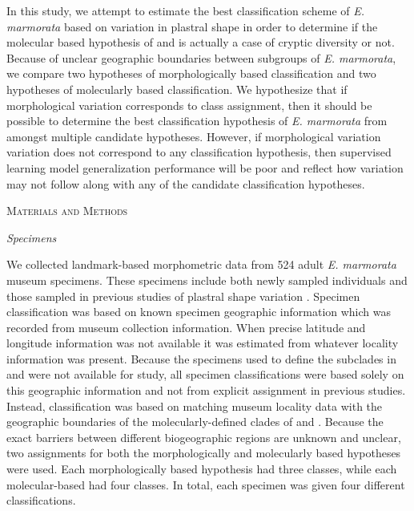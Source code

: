 \documentclass[12pt,letterpaper]{article}\usepackage{graphicx, color}
\renewcommand{\section}[1]{%
\bigskip
\begin{center}
\begin{Large}
\normalfont\scshape #1
\medskip
\end{Large}
\end{center}}
\renewcommand{\subsection}[1]{%
\bigskip
\begin{center}
\begin{large}
\normalfont\itshape #1
\end{large}
\end{center}}
\begin{document}
In this study, we attempt to estimate the best classification scheme of \textit{E. marmorata} based on variation in plastral shape in order to determine if the molecular based hypothesis of \citet{Spinks2005} and \citet{Spinks2010} is actually a case of cryptic diversity or not. Because of unclear geographic boundaries between subgroups of \textit{E. marmorata}, we compare two hypotheses of morphologically based classification and two hypotheses of molecularly based classification. We hypothesize that if morphological variation corresponds to class assignment, then it should be possible to determine the best classification hypothesis of \textit{E. marmorata} from amongst multiple candidate hypotheses. However, if morphological variation variation does not correspond to any classification hypothesis, then supervised learning model generalization performance will be poor and reflect how variation may not follow along with any of the candidate classification hypotheses.

\section{Materials and Methods}
\subsection{Specimens}
We collected landmark-based morphometric data from 524 adult \textit{E. marmorata} museum specimens. These specimens include both newly sampled individuals and those sampled in previous studies of plastral shape variation \citep{Angielczyk2007,Angielczyk2011,Angielczyk2013a}. 
Specimen classification was based on known specimen geographic information which was recorded from museum collection information. When precise latitude and longitude information was not available it was estimated from whatever locality information was present. Because the specimens used to define the subclades in \citet{Spinks2005} and \citet{Spinks2010} were not available for study, all specimen classifications were based solely on this geographic information and not from explicit assignment in previous studies. Instead, classification was based on matching museum locality data with the geographic boundaries of the molecularly-defined clades of \citet{Spinks2005} and \citet{Spinks2010}. Because the exact barriers between different biogeographic regions are unknown and unclear, two assignments for both the morphologically and molecularly based hypotheses were used. Each morphologically based hypothesis had three classes, while each molecular-based had four classes. In total, each specimen was given four different classifications. 
\end{document}
